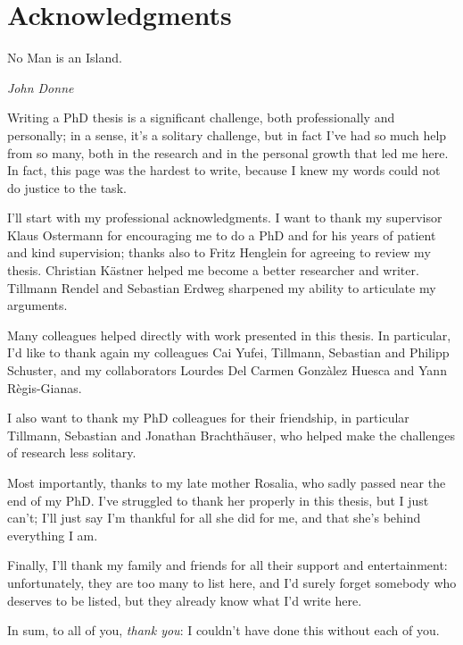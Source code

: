 
\chapter{Acknowledgments}

\epigraph{No Man is an Island.}{\textit{John Donne}}
\bigskip

Writing a PhD thesis is a significant challenge, both professionally and
personally; in a sense, it's a solitary challenge, but in fact I've had so much
help from so many, both in the research and in the personal growth that led me
here. In fact, this page was the hardest to write, because I knew my words could
not do justice to the task.

I'll start with my professional acknowledgments. I want to thank my supervisor
Klaus Ostermann for encouraging me to do a PhD and for his years of patient and
kind supervision; thanks also to Fritz Henglein for agreeing to review my
thesis. Christian Kästner helped me become a better researcher and writer.
Tillmann Rendel and Sebastian Erdweg sharpened my ability to articulate my
arguments.

Many colleagues helped directly with work presented in this thesis. In
particular, I'd like to thank again my colleagues Cai Yufei, Tillmann, Sebastian
and Philipp Schuster, and my collaborators Lourdes Del Carmen Gonzàlez Huesca and
Yann Règis-Gianas.

I also want to thank my PhD colleagues for their friendship, in particular
Tillmann, Sebastian and Jonathan Brachthäuser, who helped make the challenges of
research less solitary.

Most importantly, thanks to my late mother Rosalia, who sadly passed near the end of my
PhD. I've struggled to thank her properly in this thesis, but I just can't; I'll
just say I'm thankful for all she did for me, and that she's behind everything I
am.

Finally, I'll thank my family and friends for all their support and
entertainment: unfortunately, they are too many to list here, and I'd surely
forget somebody who deserves to be listed, but they already know what I'd write
here.

In sum, to all of you, \emph{thank you}: I couldn't have done this without each
of you.


